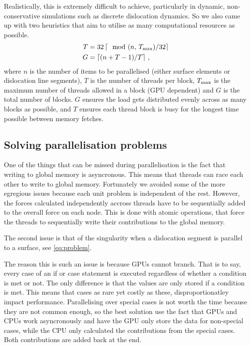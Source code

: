 Realistically, this is extremely difficult to achieve, particularly in dynamic, non-conservative simulations such as discrete dislocation dynamics. So we also came up with two heuristics that aim to utilise as many computational resources as possible.
\begin{align}\label{eq:numThreads}
    T & = 32 \left\lceil\mod(n,\, T_{\textrm{max}} )/32 \right\rceil \\
    G & = \left\lceil (n + T - 1) / T \right\rceil\,,
\end{align}
where $n$ is the number of items to be parallelised (either surface elements or dislocation line segments), $T$ is the number of threads per block, $T_{\textrm{max}}$ is the maximum number of threads allowed in a block (GPU dependent) and $G$ is the total number of blocks. $G$ ensures the load gets distributed evenly across as many blocks as possible, and $T$ ensures each thread block is busy for the longest time possible between memory fetches.

\subsection{Solving parallelisation problems}

One of the things that can be missed during parallelisation is the fact that writing to global memory is asyncronous. This means that threads can race each other to write to global memory. Fortunately we avoided some of the more egregious issues because each unit problem is independent of the rest. However, the forces calculated independently accross threads have to be sequentially added to the overall force on each node. This is done with atomic operations, that force the threads to sequentially write their contributions to the global memory.

The second issue is that of the singularity when a dislocation segment is parallel to a surface, see \cref{eq:problem}.

The reason this is such an issue is because GPUs cannot branch. That is to say, every case of an if or case statement is executed regardless of whether a condition is met or not. The only difference is that the values are only stored if a condition is met. This means that cases as rare yet costly as these, disproportionatley impact performance. Parallelising over special cases is not worth the time because they are not common enough, so the best solution use the fact that GPUs and CPUs work asyncronously and have the GPU only store the data for non-special cases, while the CPU only calculated the contributions from the special cases. Both contributions are added back at the end.

